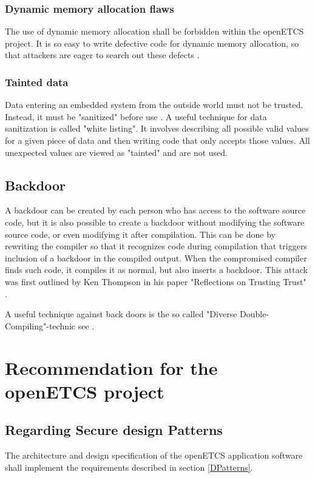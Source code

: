 \documentclass{template/openetcs_report}
\begin{document}
\subsubsection{Dynamic memory allocation flaws}
The use of dynamic memory allocation shall be forbidden within the openETCS project. It is so easy to write defective code for dynamic memory allocation, so that attackers are eager to search out these defects \cite{Kalinsky09}.

\subsubsection{Tainted data}
Data entering an embedded system from the outside world must not be trusted. Instead, it must be "sanitized" before use \cite{Kalinsky09}.
A useful technique for data sanitization is called "white listing". It involves describing all possible valid values for a given piece of data and then writing code that only accepts those values. All unexpected values are viewed as "tainted" and are not used.


\subsection{Backdoor}
\label{Backdoor}
A backdoor can be created by each person who has access to the software source code, but it is also possible to create a backdoor without modifying the software source code, or even modifying it after compilation. This can be done by rewriting the compiler so that it recognizes code during compilation that triggers inclusion of a backdoor in the compiled output. When the compromised compiler finds such code, it compiles it as normal, but also inserts a backdoor. This attack was first outlined by Ken Thompson in his paper "Reflections on Trusting Trust" \cite{Ken84}.

A useful technique against back doors is the so called "Diverse Double-Compiling"-technic see \cite{Wheeler09}. 


\section{Recommendation for the openETCS project}

\subsection{Regarding Secure design Patterns}
The architecture and design specification of the openETCS application software shall implement the requirements described in section \ref{DPatterns}.
\end{document}

